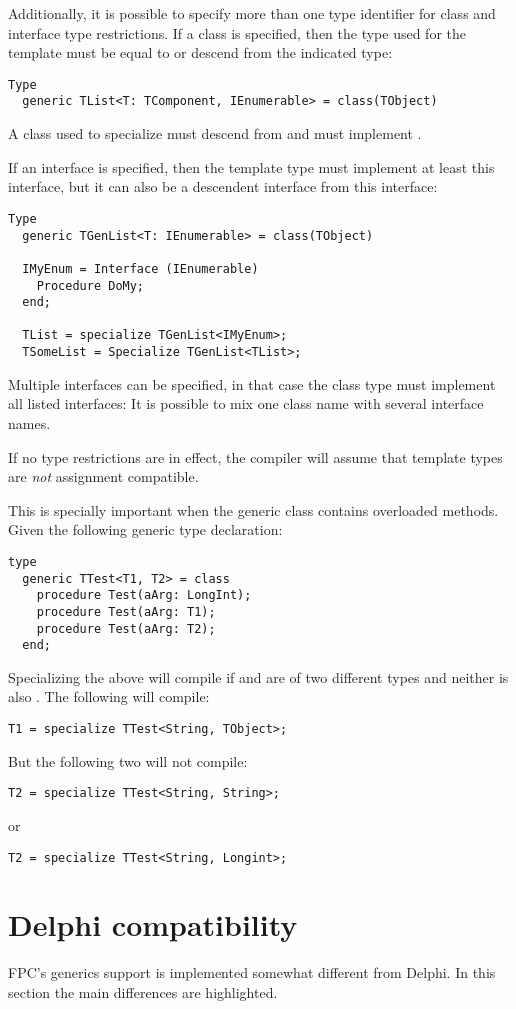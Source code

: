 Additionally, it is possible to specify more than one type identifier for class and interface type restrictions.
If a class is specified, then the type used for the template must be equal to or descend from the indicated type:
\begin{verbatim}
Type
  generic TList<T: TComponent, IEnumerable> = class(TObject)
\end{verbatim}
A class used to specialize  must descend from  and must implement .

If an interface is specified, then the template type must implement at least this interface, but it can also be a descendent interface from this interface:
\begin{verbatim}
Type
  generic TGenList<T: IEnumerable> = class(TObject)

  IMyEnum = Interface (IEnumerable)
    Procedure DoMy;
  end;

  TList = specialize TGenList<IMyEnum>;
  TSomeList = Specialize TGenList<TList>;
\end{verbatim}

Multiple interfaces can be specified, in that case the class type must implement all listed interfaces:
It is possible to mix one class name with several interface names.

If no type restrictions are in effect, the compiler will assume that template types are {\em not} assignment compatible.

This is specially important when the generic class contains overloaded methods. Given the following generic type declaration:
\begin{verbatim}
type
  generic TTest<T1, T2> = class
    procedure Test(aArg: LongInt);
    procedure Test(aArg: T1);
    procedure Test(aArg: T2);
  end;
\end{verbatim}
Specializing the above will compile if  and  are of two different types and neither is also .
The following will compile:
\begin{verbatim}
T1 = specialize TTest<String, TObject>;
\end{verbatim}
But the following two will not compile:
\begin{verbatim}
T2 = specialize TTest<String, String>;
\end{verbatim}
or
\begin{verbatim}
T2 = specialize TTest<String, Longint>;
\end{verbatim}

\section{Delphi compatibility}
FPC's generics support is implemented somewhat different from Delphi. In this section the main differences are highlighted.

